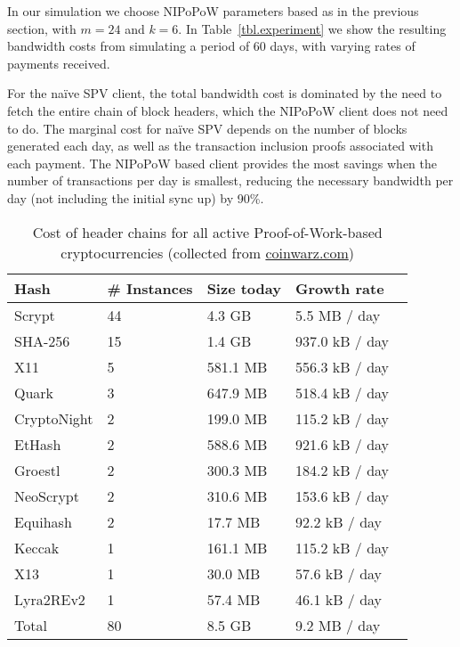  In our simulation we choose NIPoPoW parameters based as in the previous section, with $m=24$ and $k=6$.
In Table~\ref{tbl.experiment} we show the resulting bandwidth costs from simulating a period of 60 days, with varying rates of payments received.

 For the na\"ive SPV client, the total bandwidth cost is dominated by the need to fetch the entire chain of block headers, which the NIPoPoW client does not need to do. The marginal cost for na\"ive SPV depends on the number of blocks generated each day, as well as the transaction inclusion proofs associated with each payment. The NIPoPoW based client provides the most savings when the number of transactions per day is smallest, reducing the necessary bandwidth per day (not including the initial sync up) by 90\%.

\begin{table}
  \caption{Cost of header chains for all active Proof-of-Work-based cryptocurrencies (collected from \url{coinwarz.com})}
  \label{tbl.currencies}
  \small
  \centering
  \begin{tabular}{l|l|l|l}
    {\bf Hash} & {\bf \# Instances} & {\bf Size today} & {\bf Growth rate}  \\
    \hline
    Scrypt  & 44  & 4.3 GB  & 5.5 MB / day \  \\
    SHA-256  & 15  & 1.4 GB  & 937.0 kB / day \  \\
    X11  & 5  & 581.1 MB  & 556.3 kB / day \  \\
    Quark  & 3  & 647.9 MB  & 518.4 kB / day \  \\
    CryptoNight  & 2  & 199.0 MB  & 115.2 kB / day \  \\
    EtHash  & 2  & 588.6 MB  & 921.6 kB / day \  \\
    Groestl  & 2  & 300.3 MB  & 184.2 kB / day \  \\
    NeoScrypt  & 2  & 310.6 MB  & 153.6 kB / day \  \\
    Equihash  & 2  & 17.7 MB  & 92.2 kB / day \  \\
    Keccak  & 1  & 161.1 MB  & 115.2 kB / day \  \\
    X13  & 1  & 30.0 MB  & 57.6 kB / day \  \\
    Lyra2REv2  & 1  & 57.4 MB  & 46.1 kB / day \  \\
    \hline
    Total  & 80   &  8.5 GB  & 9.2 MB  / day  \\
  \end{tabular}
\end{table}



